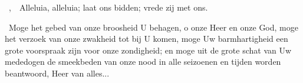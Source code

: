 \documentclass[12pt,twoside,a5paper]{article}
\begin{document}
\begin{halfparskip}
  ~\sep\ \dd~Alleluia, alleluia; laat ons bidden; vrede zij met ons.

  \cc~Moge het gebed van onze broosheid U behagen, o onze Heer en onze God, moge het verzoek van onze zwakheid tot bij U komen, moge Uw barmhartigheid een grote voorspraak zijn voor onze zondigheid; en moge uit de grote schat van Uw mededogen de smeekbeden van onze nood in alle seizoenen en tijden worden beantwoord, Heer van alles...
\end{halfparskip}


\begin{halfparskip}

  \psalm{\Ps{}}


  \psalm{\Ps{}}
\end{halfparskip}

\end{document}
